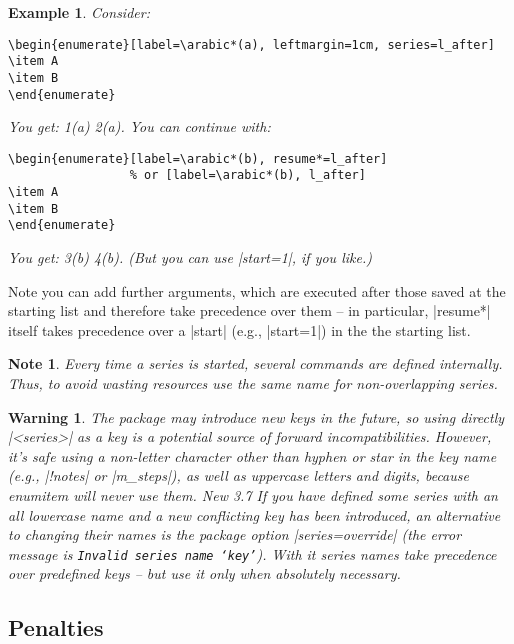 \documentclass[a4paper]{ltxguide}
\newtheorem{warning}{Warning}
\newtheorem{note}{Note}
\newtheorem{example}{Example}
\newcommand\New[1]{%
  \colorbox[rgb]{.87, .9, .83}{New #1}\enspace\ignorespaces}
\begin{document}
\begin{example}
  Consider:
\begin{verbatim}
\begin{enumerate}[label=\arabic*(a), leftmargin=1cm, series=l_after]
\item A
\item B
\end{enumerate}
\end{verbatim}
  You get: 1(a)  2(a). You can continue with:
\begin{verbatim}
\begin{enumerate}[label=\arabic*(b), resume*=l_after]
                 % or [label=\arabic*(b), l_after]
\item A
\item B
\end{enumerate}
\end{verbatim}
  You get: 3(b)  4(b). (But you can use |start=1|, if you like.)
\end{example}

Note you can add further arguments, which are executed after those
saved at the starting list and therefore take precedence over them --
in particular, |resume*| itself takes precedence over a |start| (e.g.,
|start=1|) in the the starting list.

\begin{note}
  Every time a series is started, several commands are defined 
  internally. Thus, to avoid wasting resources use the same name for 
  non-overlapping series.
\end{note}

\begin{warning}
  The package may introduce new keys in the future, so using directly
  |<series>| as a key is a potential source of forward
  incompatibilities. However, it's safe using a non-letter character
  other than hyphen or star in the key name (e.g., |!notes| or
  |m_steps|), as well as uppercase letters and digits, because
  \textsf{enumitem} will never use them. \New{3.7} If you have defined
  some series with an all lowercase name and a new conflicting key has
  been introduced, an alternative to changing their names is the
  package option |series=override| (the error message is
  \texttt{Invalid series name `key'}). With it series names take
  precedence over predefined keys -- but use it only when absolutely
  necessary.
\end{warning}

\subsection{Penalties}
\end{document}
